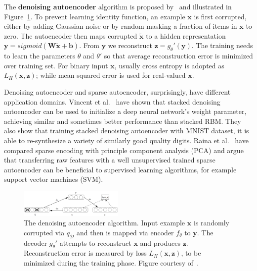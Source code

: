 The \textbf{denoising autoencoder} algorithm is proposed by~\cite{DenoiseAE} and illustrated in
Figure~\ref{Fig:dAEAlgorithm}.
To prevent learning identity function, an example $\mathbf{x}$ is first corrupted, either by
adding Gaussian noise or by random masking a fraction of items in $\mathbf{x}$ to zero.
The autoencoder then maps corrupted $\mathbf{\tilde{x}}$ to a hidden representation $\mathbf{y} = sigmoid(\mathbf{W}\tilde{\mathbf{x}} + \mathbf{b})$.
From $\mathbf{y}$ we reconstruct $\mathbf{z}=g_\theta'(\mathbf{y})$.
The training needs to learn the parameters $\theta$ and $\theta'$ so that
average reconstruction error is minimized over training set.
For binary input $\mathbf{x}$, usually cross entropy is adopted as $L_H(\mathbf{x}, \mathbf{z})$;
while mean squared error is used for real-valued $\mathbf{x}$.

Denoising autoencoder and sparse autoencoder, surprisingly, have different application domains.
Vincent et al.~\cite{DenoiseAE} have shown that stacked denoising autoencoder can be used to
initialize a deep neural network's weight parameter,
achieving similar and sometimes better performance than stacked RBM.
They also show that training stacked denoising autoencoder with MNIST dataset, it is able
to re-synthesize a variety of similarly good quality digits.
Raina et al.~\cite{SparseAE} have compared sparse encoding with principle component analysis
(PCA) and argue that transferring raw features with a well unsupervised trained
sparse autoencoder can be beneficial to supervised learning algorithms,
for example support vector machines (SVM).
\begin{figure}[h]
    \centering
    \includegraphics[width=0.45\textwidth]{figures/denoiseautoencoder.png}
        \caption{The denoising autoencoder algorithm.
        Input example $\mathbf{x}$ is randomly corrupted via $q_\mathcal{D}$ and then
        is mapped via encoder $f_\theta$ to $\mathbf{y}$.
        The decoder $g_\theta'$ attempts to reconstruct $\mathbf{x}$ and produces $\mathbf{z}$.
        Reconstruction error is measured by loss $L_H(\mathbf{x}, \mathbf{z})$, to be minimized
        during the training phase.
        Figure courtesy of~\cite{DenoiseAE}.}
    \label{Fig:dAEAlgorithm}
\end{figure}

